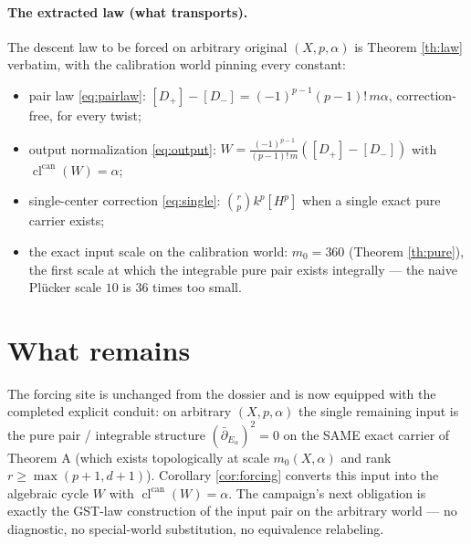 \documentclass[11pt]{article}
\theoremstyle{definition}
\newcommand{\cl}{\operatorname{cl}^{\operatorname{can}}}
\newcommand{\ddbar}{\bar\partial}
\begin{document}
\paragraph{The extracted law (what transports).}
The descent law to be forced on arbitrary original $(X,p,\alpha)$ is
Theorem \ref{th:law} verbatim, with the calibration world pinning
every constant:
\begin{itemize}
\item pair law \eqref{eq:pairlaw}: $[D_+]-[D_-]=(-1)^{p-1}(p-1)!\,m\alpha$,
correction-free, for every twist;
\item output normalization \eqref{eq:output}:
$W=\tfrac{(-1)^{p-1}}{(p-1)!\,m}([D_+]-[D_-])$ with $\cl(W)=\alpha$;
\item single-center correction \eqref{eq:single}:
$\binom rp k^p[H^p]$ when a single exact pure carrier exists;
\item the exact input scale on the calibration world: $m_0=360$
(Theorem \ref{th:pure}), the first scale at which the integrable pure
pair exists integrally --- the naive Pl\"ucker scale $10$ is
$36$ times too small.
\end{itemize}

\section{What remains}

The forcing site is unchanged from the dossier and is now equipped
with the completed explicit conduit: on arbitrary $(X,p,\alpha)$ the
single remaining input is the pure pair / integrable structure
$(\ddbar_{E_\alpha})^2=0$ on the SAME exact carrier of Theorem A
(which exists topologically at scale $m_0(X,\alpha)$ and rank
$r\ge\max(p+1,d+1)$). Corollary \ref{cor:forcing} converts this input
into the algebraic cycle $W$ with $\cl(W)=\alpha$. The campaign's
next obligation is exactly the GST-law construction of the input pair
on the arbitrary world --- no diagnostic, no special-world
substitution, no equivalence relabeling.
\end{document}
